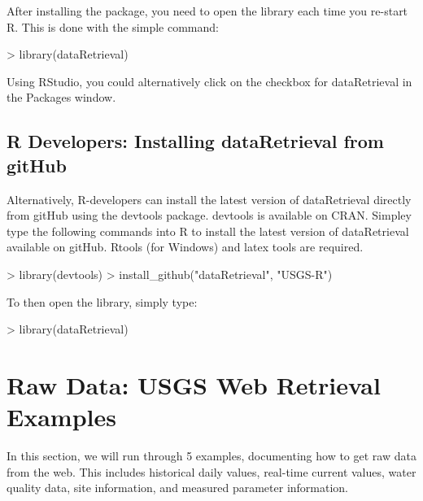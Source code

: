 \documentclass[a4paper,11pt]{article}
\begin{document}
After installing the package, you need to open the library each time you re-start R.  This is done with the simple command:
\begin{Schunk}
\begin{Sinput}
> library(dataRetrieval)
\end{Sinput}
\end{Schunk}
Using RStudio, you could alternatively click on the checkbox for dataRetrieval in the Packages window.

\subsection{R Developers: Installing dataRetrieval from gitHub}
Alternatively, R-developers can install the latest version of dataRetrieval directly from gitHub using the devtools package.  devtools is available on CRAN.  Simpley type the following commands into R to install the latest version of dataRetrieval available on gitHub.  Rtools (for Windows) and latex tools are required.

\begin{Schunk}
\begin{Sinput}
> library(devtools)
> install_github("dataRetrieval", "USGS-R")
\end{Sinput}
\end{Schunk}
To then open the library, simply type:

\begin{Schunk}
\begin{Sinput}
> library(dataRetrieval)
\end{Sinput}
\end{Schunk}

\newpage
\section{Raw Data: USGS Web Retrieval Examples}
In this section, we will run through 5 examples, documenting how to get raw data from the web. This includes historical daily values, real-time current values, water quality data, site information, and measured parameter information. 
\end{document}
